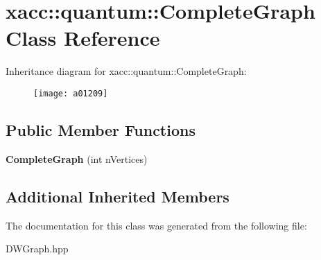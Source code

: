 \hypertarget{a01209}{}\section{xacc\+:\+:quantum\+:\+:Complete\+Graph Class Reference}
\label{a01209}
Inheritance diagram for xacc\+:\+:quantum\+:\+:Complete\+Graph\+:\begin{figure}[H]
\begin{center}
\leavevmode
\texttt{[image: a01209]}
\end{center}
\end{figure}
\subsection*{Public Member Functions}
\begin{DoxyCompactItemize}
\item 
\mbox{\label{a01209_a70eeb65709e217e61bb0066365579c39}} 
{\bfseries Complete\+Graph} (int n\+Vertices)
\end{DoxyCompactItemize}
\subsection*{Additional Inherited Members}


The documentation for this class was generated from the following file\+:\begin{DoxyCompactItemize}
\item 
D\+W\+Graph.\+hpp\end{DoxyCompactItemize}
